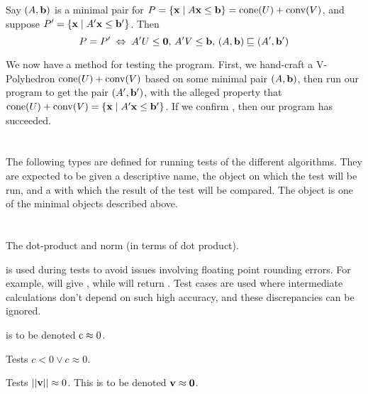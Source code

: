 \begin{EqCriteria}\label{eq_vp_hp}
	Say $(A,\mathbf{b})$ is a minimal pair for $P = \left\{\mathbf{x}\;|\; A\mathbf{x}\leq \mathbf{b}\right\} = \operatorname{cone}(U) + \operatorname{conv}(V)$, and suppose $P' = \left\{\mathbf{x}\;|\; A'\mathbf{x}\leq \mathbf{b}'\right\}$.  Then
	\[ P = P' \;\Leftrightarrow\; A'U\leq\mathbf{0},\, A'V\leq\mathbf{b},\, (A,\mathbf{b})\sqsubseteq (A',\mathbf{b}')\]
\end{EqCriteria}

\begin{Test}\label{test_vp_to_hp}
	We now have a method for testing the program.  First, we hand-craft a V-Polyhedron $\operatorname{cone}(U) + \operatorname{conv}(V)$ based on some minimal pair $(A,\mathbf{b})$, then run our program to get the pair $(A',\mathbf{b}')$, with the alleged property that $\operatorname{cone}(U) + \operatorname{conv}(V) = \left\{\mathbf{x}\;|\; A'\mathbf{x}\leq \mathbf{b}'\right\}$.  If we confirm , then our program has succeeded.
\end{Test}

\section{}

The following types are defined for running tests of the different algorithms.  They are expected to be given a descriptive name, the object on which the test will be run, and a  with which the result of the test will be compared.  The  object is one of the minimal objects described above.
\lsthconetestcasea
\lstvconetestcasea
\lsthpolytestcaseb
\lstvpolytestcaseb

\section{}

The dot-product and norm (in terms of dot product).
\lstoperator
\lstnorm

 is used during tests to avoid issues involving floating point rounding errors.  For example,  will give , while  will return .  Test cases are used where intermediate calculations don't depend on such high accuracy, and these discrepancies can be ignored.

 is to be denoted $\mli{c} \approx 0$.
\lstapproximatelyzeroa

Tests $c < 0 \lor c \approx 0$.
\lstapproximatelyltzero

Tests $\left|\left|\mathbf{v}\right|\right| \approx 0$.  This is to be denoted $\mathbf{v} \approx \mathbf{0}$.
\lstapproximatelyzerob


